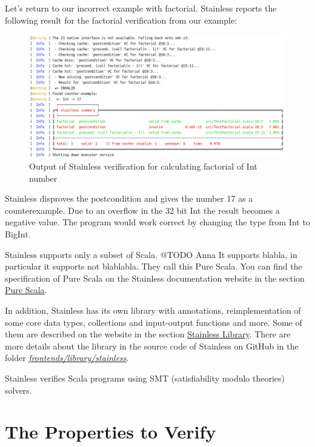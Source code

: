 Let's return to our incorrect example with factorial.
Stainless reports the following result for the factorial verification from our example:
\begin{figure}[H]
	\centering
		\includegraphics[scale=0.5]{images/output1.png}
	\caption{Output of Stainless verification for calculating factorial of Int number}
	\label{fig:output1}
\end{figure}

Stainless disproves the postcondition and gives the number 17 as a counterexample.
Due to an overflow in the 32 bit Int the result becomes a negative value.
The program would work correct by changing the type from Int to BigInt.

Stainless supports only a subset of Scala. @TODO Anna It supports blabla, in particular it supports not blablabla.
They call this Pure Scala.
You can find the specification of Pure Scala on the Stainless documentation website \cite{Stainless:documentation} in the section \href{https://epfl-lara.github.io/stainless/purescala.html}{Pure Scala}.

In addition, Stainless has its own library with annotations, reimplementation of some core data types, collections and input-output functions and more.
Some of them are described on the website in the section \href{https://epfl-lara.github.io/stainless/library.html}{Stainless Library}.
There are more details about the library in the source code of Stainless on GitHub \cite{Stainless:github} in the folder \href{https://github.com/epfl-lara/stainless/tree/master/frontends/library/stainless}{\textit{frontends/library/stainless}}.

Stainless verifies Scala programs using SMT (satisfiability modulo theories) solvers. 


\section{The Properties to Verify}

